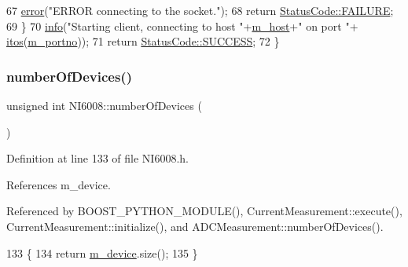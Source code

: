 \begin{DoxyCode}
67       \hyperlink{classObject_a204a95f57818c0f811933917a30eff45}{error}(\textcolor{stringliteral}{"ERROR connecting to the socket."});
68       \textcolor{keywordflow}{return} \hyperlink{classStatusCode_a6f565cbeadc76d14c72f047e5e85eb4ba3da73d4c469762eb9d3c960368252b26}{StatusCode::FAILURE};
69     \}
70     \hyperlink{classObject_a644fd329ea4cb85f54fa6846484b84a8}{info}(\textcolor{stringliteral}{"Starting client, connecting to host "}+\hyperlink{classNI6008_ab8b247caa89b1dc9b9c78b0c1b08ed5d}{m\_host}+\textcolor{stringliteral}{" on port "}+
      \hyperlink{Tools_8h_af330027dbdafb9a30768b3613c553e60}{itos}(\hyperlink{classNI6008_aabb914d00c938a12e99c1078f40fb104}{m\_portno}));
71     \textcolor{keywordflow}{return} \hyperlink{classStatusCode_a6f565cbeadc76d14c72f047e5e85eb4badd0da38d3ba0d922efd1f4619bc37ad8}{StatusCode::SUCCESS};
72   \}
\end{DoxyCode}
\mbox{\label{classNI6008_a293fbf44b101e82a57404d1c76f07a87}} 
\subsubsection{\texorpdfstring{number\+Of\+Devices()}{numberOfDevices()}}
{\footnotesize\ttfamily unsigned int N\+I6008\+::number\+Of\+Devices (\begin{DoxyParamCaption}{ }\end{DoxyParamCaption})\hspace{0.3cm}{\ttfamily [inline]}}



Definition at line 133 of file N\+I6008.\+h.



References m\+\_\+device.



Referenced by B\+O\+O\+S\+T\+\_\+\+P\+Y\+T\+H\+O\+N\+\_\+\+M\+O\+D\+U\+L\+E(), Current\+Measurement\+::execute(), Current\+Measurement\+::initialize(), and A\+D\+C\+Measurement\+::number\+Of\+Devices().


\begin{DoxyCode}
133                                 \{
134     \textcolor{keywordflow}{return} \hyperlink{classNI6008_ac7225d517d42b1b7553dc75dccb29b58}{m\_device}.size();
135   \}
\end{DoxyCode}
\mbox{\label{classNI6008_a76df6d88710b15448145498cebe65228}} 
